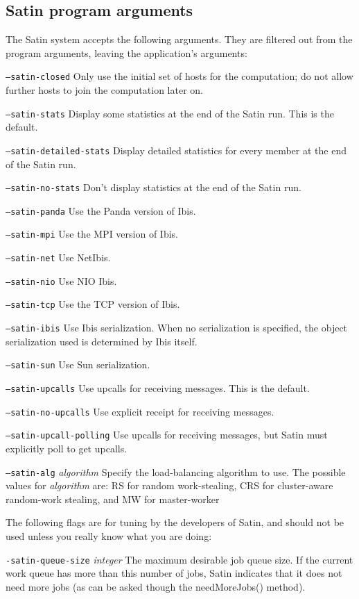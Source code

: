 \documentclass[10pt]{article}
\newcommand{\mysubsection}[1]{\subsection{#1}\label{#1}}
\begin{document}
\mysubsection{Satin program arguments}

The Satin system accepts the following arguments. They are
filtered out from the program arguments, leaving the application's
arguments:
\begin{description}
\item{\texttt{--satin-closed}}
Only use the initial set of hosts for the computation; do not allow
further hosts to join the computation later on.
\item{\texttt{--satin-stats}}
Display some statistics at the end of the Satin run. This is the default.
\item{\texttt{--satin-detailed-stats}}
Display detailed statistics for every member at the end of the Satin run.
\item{\texttt{--satin-no-stats}}
Don't display statistics at the end of the Satin run.
\item{\texttt{--satin-panda}}
Use the Panda version of Ibis.
\item{\texttt{--satin-mpi}}
Use the MPI version of Ibis.
\item{\texttt{--satin-net}}
Use NetIbis.
\item{\texttt{--satin-nio}}
Use NIO Ibis.
\item{\texttt{--satin-tcp}}
Use the TCP version of Ibis.
\item{\texttt{--satin-ibis}}
Use Ibis serialization. When no serialization is specified,
the object serialization used is determined by Ibis itself.
\item{\texttt{--satin-sun}}
Use Sun serialization.
\item{\texttt{--satin-upcalls}}
Use upcalls for receiving messages. This is the default.
\item{\texttt{--satin-no-upcalls}}
Use explicit receipt for receiving messages.
\item{\texttt{--satin-upcall-polling}}
Use upcalls for receiving messages, but Satin must explicitly poll to get
upcalls.
\item{\texttt{--satin-alg} \emph{algorithm}}
Specify the load-balancing algorithm to use. The possible values for
\emph{algorithm} are: RS for random work-stealing, CRS for cluster-aware
random-work stealing, and MW for master-worker
\end{description}

The following flags are for tuning by the developers of Satin,
and should not be used unless you really know what you are doing:
\begin{description}
\item{\texttt{-satin-queue-size} \emph{integer}}
The maximum desirable job queue size. If the current work queue 
has more than this number of jobs, Satin indicates that 
it does not need more jobs (as can be asked though the
needMoreJobs() method).
\end{description}
\end{document}
